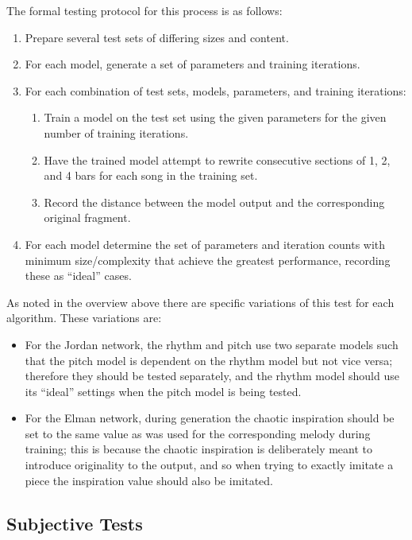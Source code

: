 \documentclass[ author={Stephen Livermore-Tozer},
				supervisor={Dr. Peter Flach},
				degree={MEng},
				title={Algorithmic Co-composition Using Machine Learning},
				subtitle={},
				type={research},
				year={2016} ]{dissertation}
\begin{document}
	The formal testing protocol for this process is as follows:
	\begin{enumerate}
		\item Prepare several test sets of differing sizes and content.
		\item For each model, generate a set of parameters and training iterations.
		\item For each combination of test sets, models, parameters, and training iterations:
		\begin{enumerate}
			\item Train a model on the test set using the given parameters for the given number of training iterations.
			\item Have the trained model attempt to rewrite consecutive sections of 1, 2, and 4 bars for each song in the training set.
			\item Record the distance between the model output and the corresponding original fragment.
		\end{enumerate}
		\item For each model determine the set of parameters and iteration counts with minimum size/complexity that achieve the greatest performance, recording these as ``ideal'' cases.
	\end{enumerate}
	
	As noted in the overview above there are specific variations of this test for each algorithm. These variations are:
	\begin{itemize}
		\item For the Jordan network, the rhythm and pitch use two separate models such that the pitch model is dependent on the rhythm model but not vice versa; therefore they should be tested separately, and the rhythm model should use its ``ideal'' settings when the pitch model is being tested.
		\item For the Elman network, during generation the chaotic inspiration should be set to the same value as was used for the corresponding melody during training; this is because the chaotic inspiration is deliberately meant to introduce originality to the output, and so when trying to exactly imitate a piece the inspiration value should also be imitated.
	\end{itemize}
	
	\subsection{Subjective Tests}
	\label{sec:subjective-analysis}
	
\end{document}

